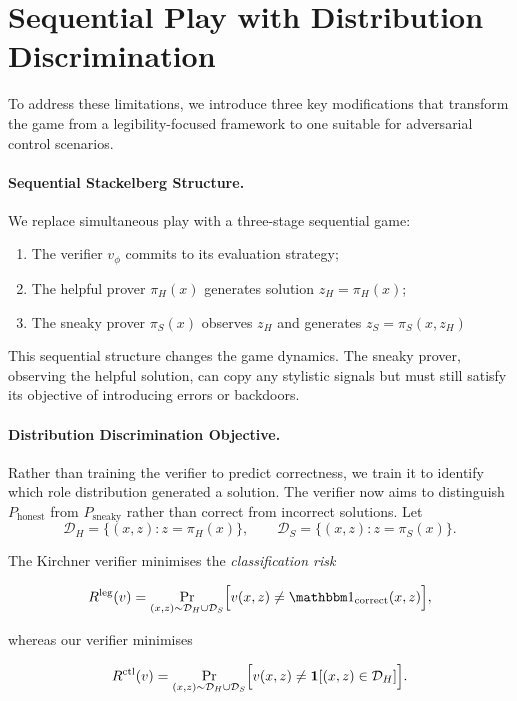 \section{Sequential Play with Distribution Discrimination}

To address these limitations, we introduce three key modifications that transform the game from a legibility-focused framework to one suitable for adversarial control scenarios.

\paragraph{Sequential Stackelberg Structure.} We replace simultaneous play with a three-stage sequential game:
\begin{enumerate}
    \item The verifier $v_\phi$ commits to its evaluation strategy;
    \item The helpful prover $\pi_H(x)$ generates solution $z_H = \pi_H(x)$;
    \item The sneaky prover $\pi_S(x)$ observes $z_H$ and generates $z_S = \pi_S(x, z_H)$
\end{enumerate}

This sequential structure changes the game dynamics. The sneaky prover, observing the helpful solution, can copy any stylistic signals but must still satisfy its objective of introducing errors or backdoors.

\paragraph{Distribution Discrimination Objective.}\label{p:distribution-discrimination} Rather than training the verifier to predict correctness, we train it to identify which role distribution generated a solution. The verifier now aims to distinguish $P_{\text{honest}}$ from $P_{\text{sneaky}}$ rather than correct from incorrect solutions. Let
\[
\mathcal D_H=\bigl\{(x,z):z=\pi_H(x)\bigr\},\qquad
\mathcal D_S=\bigl\{(x,z):z=\pi_S(x)\bigr\}.
\]

The Kirchner verifier minimises the \textit{classification risk}

\[
R^\text{leg}(v)=\Pr_{(x,z)\sim\mathcal D_H\cup\mathcal D_S}
               \Bigl[v(x,z)\neq \corr(x,z)\Bigr],
\]

whereas our verifier minimises

\[\label{eq:dist_disc_risk}
R^\text{ctl}(v)=\Pr_{(x,z)\sim\mathcal D_H\cup\mathcal D_S}
                \Bigl[v(x,z)\neq\mathbf 1[(x,z)\in\mathcal D_H]\Bigr].
\]


